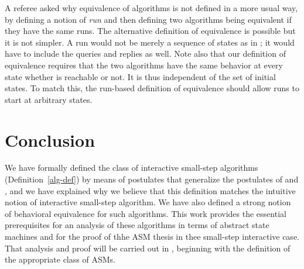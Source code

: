 \documentclass{LMCS}
\theoremstyle{definition}
\begin{document}
A referee asked why equivalence of algorithms is not defined in a more
usual way, by defining a notion of \emph{run} and then defining two
algorithms being equivalent if they have the same runs.  The
alternative definition of equivalence is possible but it is not
simpler.  A run would not be merely a sequence of states as in
\cite{seqth, parth}; it would have to include the queries and replies
as well.  Note also that our definition of equivalence requires that
the two algorithms have the same behavior at every state  whether
 is reachable or not.  It is thus independent of the set of initial
states.  To match this, the run-based definition of equivalence should
allow runs to start at arbitrary states.

\section{Conclusion}

We have formally defined the class of interactive small-step
algorithms (Definition~\ref{alg-def}) by means of postulates that
generalize the postulates of \cite{seqth} and \cite{oa1}, and we have
explained why we believe that this definition matches the intuitive
notion of interactive small-step algorithm.  We have also defined a
strong notion of behavioral equivalence for such algorithms.  This
work provides the essential prerequisites for an analysis of these
algorithms in terms of abstract state machines and for the proof of
thhe ASM thesis in thee small-step interactive case.  That analysis
and proof will be carried out in \cite{ga2}, beginning with the
definition of the appropriate class of ASMs.
\end{document}

